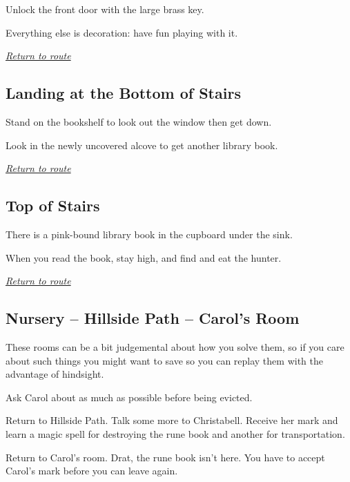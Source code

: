 \documentclass[a5paper]{extarticle}
\begin{document}
Unlock the front door with the large brass key.

Everything else is decoration: have fun playing with it.

\hyperref[sec:route-5]{\emph{Return to route}}

\newpage
\subsection{Landing at the Bottom of Stairs}\label{sec:sol-Landing-at-the-Bottom-of-Stairs}

Stand on the bookshelf to look out the window then get down.

Look in the newly uncovered alcove to get another library book.

\hyperref[sec:route-5]{\emph{Return to route}}

\newpage
\subsection{Top of Stairs}\label{sec:sol-Top-of-Stairs}

There is a pink-bound library book in the cupboard under the sink.

When you read the book, stay high, and find and eat the hunter.

\hyperref[sec:route-5]{\emph{Return to route}}

\newpage
\subsection{Nursery -- Hillside Path -- Carol's Room}\label{sec:sol-Nursery--Hillside-Path--Carol's-Room}

These rooms can be a bit judgemental about how you solve them, so if you care
about such things you might want to save so you can replay them with the advantage
of hindsight.

Ask Carol about as much as possible before being evicted.

Return to Hillside Path.
Talk some more to Christabell.
Receive her mark and learn a magic spell for destroying the rune book
and another for transportation.

Return to Carol's room.
Drat, the rune book isn't here. You have to accept Carol's mark before you can leave again.
\end{document}
